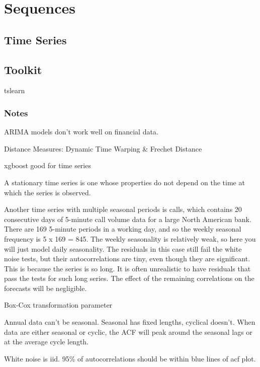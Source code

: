 \documentclass[]{book}
\begin{document}
\hypertarget{sequences-1}{%
\chapter{Sequences}\label{sequences-1}}

\hypertarget{time-series}{%
\section{Time Series}\label{time-series}}

\hypertarget{toolkit-1}{%
\section{Toolkit}\label{toolkit-1}}

tslearn

\hypertarget{notes-1}{%
\subsection{Notes}\label{notes-1}}

ARIMA models don't work well on financial data.

Distance Measures: Dynamic Time Warping \& Frechet Distance

xgboost good for time series

A stationary time series is one whose properties do not depend on the time at which the series is observed.

Another time series with multiple seasonal periods is calls, which contains 20 consecutive days of 5-minute call volume data for a large North American bank. There are 169 5-minute periods in a working day, and so the weekly seasonal frequency is 5 x 169 = 845. The weekly seasonality is relatively weak, so here you will just model daily seasonality. The residuals in this case still fail the white noise tests, but their autocorrelations are tiny, even though they are significant. This is because the series is so long. It is often unrealistic to have residuals that pass the tests for such long series. The effect of the remaining correlations on the forecasts will be negligible.

Box-Cox transformation parameter

Annual data can't be seasonal. Seasonal has fixed lengths, cyclical doesn't. When data are either seasonal or cyclic, the ACF will peak around the seasonal lags or at the average cycle length.

White noise is iid. 95\% of autocorrelations should be within blue lines of acf plot.
\end{document}
